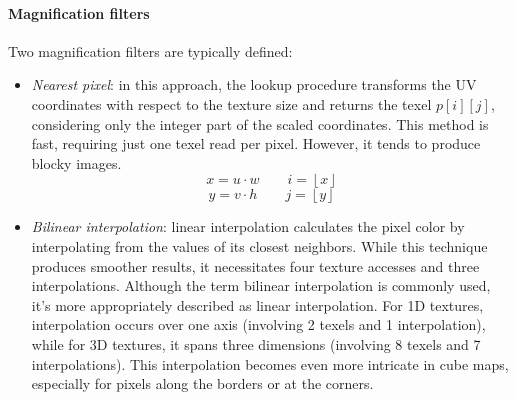 \paragraph*{Magnification filters}
Two magnification filters are typically defined:
\begin{itemize}
    \item \textit{Nearest pixel}: in this approach, the lookup procedure transforms the UV coordinates with respect to the texture size and returns the texel $p[i][j]$, considering only the integer part of the scaled coordinates. 
        This method is fast, requiring just one texel read per pixel. 
        However, it tends to produce blocky images.
        \[x=u\cdot w \qquad i=\left\lfloor x \right\rfloor\]
        \[y=v\cdot h \qquad j=\left\lfloor y \right\rfloor\]
    \item \textit{Bilinear interpolation}: linear interpolation calculates the pixel color by interpolating from the values of its closest neighbors. 
        While this technique produces smoother results, it necessitates four texture accesses and three interpolations.
        Although the term bilinear interpolation is commonly used, it's more appropriately described as linear interpolation. 
        For 1D textures, interpolation occurs over one axis (involving 2 texels and 1 interpolation), while for 3D textures, it spans three dimensions (involving 8 texels and 7 interpolations). 
        This interpolation becomes even more intricate in cube maps, especially for pixels along the borders or at the corners.
\end{itemize}

